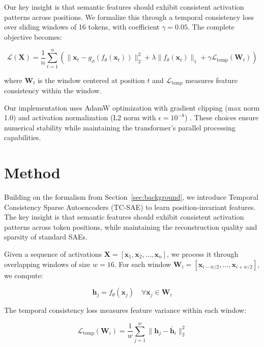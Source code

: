 \documentclass{article} %
\begin{document}
Our key insight is that semantic features should exhibit consistent activation patterns across positions. We formalize this through a temporal consistency loss over sliding windows of 16 tokens, with coefficient $\gamma=0.05$. The complete objective becomes:

\begin{equation}
    \mathcal{L}(\mathbf{X}) = \frac{1}{n} \sum_{t=1}^n \left( \|\mathbf{x}_t - g_\phi(f_\theta(\mathbf{x}_t))\|_2^2 + \lambda \|f_\theta(\mathbf{x}_t)\|_1 + \gamma \mathcal{L}_{\text{temp}}(\mathbf{W}_t) \right)
\end{equation}

where $\mathbf{W}_t$ is the window centered at position $t$ and $\mathcal{L}_{\text{temp}}$ measures feature consistency within the window.

Our implementation uses AdamW optimization \cite{loshchilov2017adamw} with gradient clipping (max norm 1.0) and activation normalization (L2 norm with $\epsilon=10^{-8}$) \cite{kingma2014adam}. These choices ensure numerical stability while maintaining the transformer's parallel processing capabilities.

\section{Method}
\label{sec:method}

Building on the formalism from Section~\ref{sec:background}, we introduce Temporal Consistency Sparse Autoencoders (TC-SAE) to learn position-invariant features. The key insight is that semantic features should exhibit consistent activation patterns across token positions, while maintaining the reconstruction quality and sparsity of standard SAEs.

Given a sequence of activations $\mathbf{X} = [\mathbf{x}_1, \mathbf{x}_2, \ldots, \mathbf{x}_n]$, we process it through overlapping windows of size $w=16$. For each window $\mathbf{W}_i = [\mathbf{x}_{i-w/2}, \ldots, \mathbf{x}_{i+w/2}]$, we compute:

\begin{equation}
    \mathbf{h}_j = f_\theta(\mathbf{x}_j) \quad \forall \mathbf{x}_j \in \mathbf{W}_i
\end{equation}

The temporal consistency loss measures feature variance within each window:

\begin{equation}
    \mathcal{L}_{\text{temp}}(\mathbf{W}_i) = \frac{1}{w} \sum_{j=1}^w \|\mathbf{h}_j - \bar{\mathbf{h}}_i\|_2^2
\end{equation}
\end{document}
